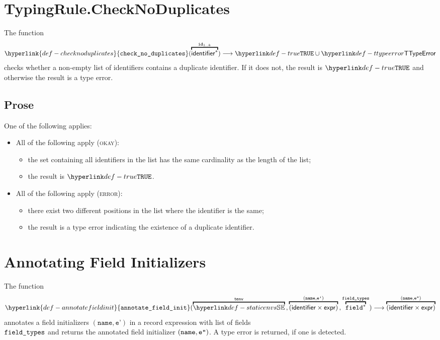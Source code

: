 \documentclass{book}
\newcommand\annotaterel[0]{\hyperlink{def-annotaterel}{\textsf{type}}}
\newcommand\typearrow[0]{\xrightarrow{\annotaterel}}
\newcommand\annotatefieldinit[0]{\hyperlink{def-annotatefieldinit}{\texttt{annotate\_field\_init}}}
\newcommand\checknoduplicates[0]{\hyperlink{def-checknoduplicates}{\texttt{check\_no\_duplicates}}}
\newcommand\vep[0]{\texttt{e'}}
\newcommand\name[0]{\texttt{name}}
\begin{document}
\section{TypingRule.CheckNoDuplicates \label{sec:TypingRule.CheckNoDuplicates}}
The function
\[
  \checknoduplicates(\overname{\identifier^*}{\id_{1..k}}) \aslto \True \cup \TTypeError
\]
checks whether a non-empty list of identifiers contains a duplicate identifier. If it does not, the result
is $\True$ and otherwise the result is a type error.

\subsection{Prose}
One of the following applies:
\begin{itemize}
  \item All of the following apply (\textsc{okay}):
  \begin{itemize}
    \item the set containing all identifiers in the list has the same cardinality as the length of the list;
    \item the result is $\True$.
  \end{itemize}

  \item All of the following apply (\textsc{error}):
  \begin{itemize}
    \item there exist two different positions in the list where the identifier is the same;
    \item the result is a type error indicating the existence of a duplicate identifier.
  \end{itemize}
\end{itemize}


\hypertarget{def-annotatefieldinit}{}
\section{Annotating Field Initializers}
The function
\[
  \annotatefieldinit(
    \overname{\staticenvs}{\tenv} \aslsep
    \overname{(\identifier\times\expr)}{(\name, \vep)} \aslsep
    \overname{\field^*}{\fieldtypes}
  ) \aslto
  \overname{(\identifier\times\expr)}{(\name, \vepp)}
\]
annotates a field initializers $(\name, \vep)$ in a record expression
with list of fields \\ $\texttt{field\_types}$ and returns the annotated field initializer
$(\name, \vepp)$. A type error is returned, if one is detected.
\end{document}
